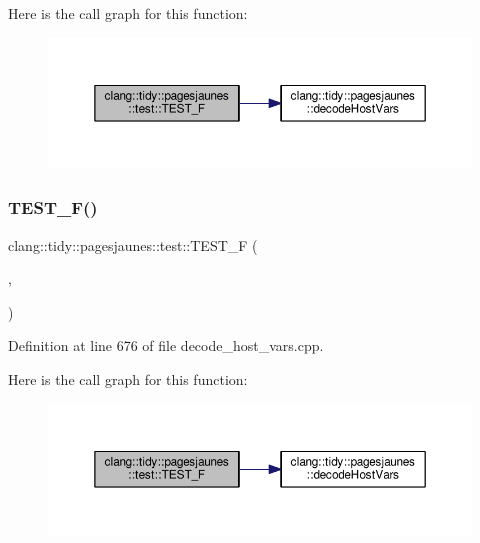 Here is the call graph for this function\+:
\nopagebreak
\begin{figure}[H]
\begin{center}
\leavevmode
\includegraphics[width=350pt]{namespaceclang_1_1tidy_1_1pagesjaunes_1_1test_ad70912e713fc4ccf969b680167a14ded_cgraph}
\end{center}
\end{figure}
\mbox{\label{namespaceclang_1_1tidy_1_1pagesjaunes_1_1test_a12a6c11bb1f8cc70dd3a3a78bfc41dd6}} 
\subsubsection{\texorpdfstring{T\+E\+S\+T\+\_\+\+F()}{TEST\_F()}\hspace{0.1cm}{\footnotesize\ttfamily [57/57]}}
{\footnotesize\ttfamily clang\+::tidy\+::pagesjaunes\+::test\+::\+T\+E\+S\+T\+\_\+F (\begin{DoxyParamCaption}\item[{\hyperlink{classclang_1_1tidy_1_1pagesjaunes_1_1test_1_1_decode_host_vars_test}{Decode\+Host\+Vars\+Test}}]{,  }\item[{Decode\+Host\+Vars\+Weird}]{ }\end{DoxyParamCaption})}



Definition at line 676 of file decode\+\_\+host\+\_\+vars.\+cpp.

Here is the call graph for this function\+:
\nopagebreak
\begin{figure}[H]
\begin{center}
\leavevmode
\includegraphics[width=350pt]{namespaceclang_1_1tidy_1_1pagesjaunes_1_1test_a12a6c11bb1f8cc70dd3a3a78bfc41dd6_cgraph}
\end{center}
\end{figure}
